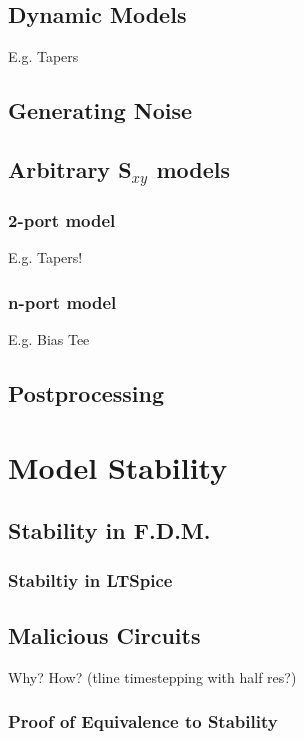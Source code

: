 \documentclass{article}
\begin{document}
\subsection{Dynamic Models}

E.g. Tapers

\subsection{Generating Noise}

\subsection{Arbitrary S$_{xy}$ models}

\subsubsection{2-port model}

E.g. Tapers!

\subsubsection{n-port model}

E.g. Bias Tee

\subsection{Postprocessing}

\section{Model Stability}

\subsection{Stability in F.D.M.}

\subsubsection{Stabiltiy in LTSpice}

\subsection{Malicious Circuits}

Why? How? (tline timestepping with half res?)

\subsubsection{Proof of Equivalence to Stability}
\end{document}
